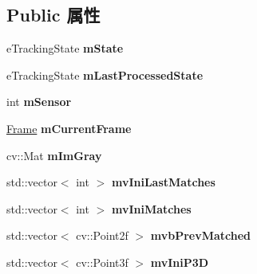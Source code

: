 \subsection*{Public 属性}
\begin{DoxyCompactItemize}
\item 
\hypertarget{classORB__SLAM2_1_1Tracking_a37cadc53a335fd802fed2fd9b24e93e1}{e\-Tracking\-State {\bfseries m\-State}}\label{classORB__SLAM2_1_1Tracking_a37cadc53a335fd802fed2fd9b24e93e1}

\item 
\hypertarget{classORB__SLAM2_1_1Tracking_a98be1e579a7e9271449d079c4f3c8769}{e\-Tracking\-State {\bfseries m\-Last\-Processed\-State}}\label{classORB__SLAM2_1_1Tracking_a98be1e579a7e9271449d079c4f3c8769}

\item 
\hypertarget{classORB__SLAM2_1_1Tracking_a18bffeb950dd18e5d74807cd9741c013}{int {\bfseries m\-Sensor}}\label{classORB__SLAM2_1_1Tracking_a18bffeb950dd18e5d74807cd9741c013}

\item 
\hypertarget{classORB__SLAM2_1_1Tracking_ad21299ab1995c8fb7115bda57773d307}{\hyperlink{classORB__SLAM2_1_1Frame}{Frame} {\bfseries m\-Current\-Frame}}\label{classORB__SLAM2_1_1Tracking_ad21299ab1995c8fb7115bda57773d307}

\item 
\hypertarget{classORB__SLAM2_1_1Tracking_af7ef78c9eed81f0701a1d12b3f377875}{cv\-::\-Mat {\bfseries m\-Im\-Gray}}\label{classORB__SLAM2_1_1Tracking_af7ef78c9eed81f0701a1d12b3f377875}

\item 
\hypertarget{classORB__SLAM2_1_1Tracking_ace08a986d9cbe3fe578c189242b94489}{std\-::vector$<$ int $>$ {\bfseries mv\-Ini\-Last\-Matches}}\label{classORB__SLAM2_1_1Tracking_ace08a986d9cbe3fe578c189242b94489}

\item 
\hypertarget{classORB__SLAM2_1_1Tracking_a1c89fa1b3512238f15283857ed94c79a}{std\-::vector$<$ int $>$ {\bfseries mv\-Ini\-Matches}}\label{classORB__SLAM2_1_1Tracking_a1c89fa1b3512238f15283857ed94c79a}

\item 
\hypertarget{classORB__SLAM2_1_1Tracking_a9ee7c26c1db845fef73c55ee0bb5c9f2}{std\-::vector$<$ cv\-::\-Point2f $>$ {\bfseries mvb\-Prev\-Matched}}\label{classORB__SLAM2_1_1Tracking_a9ee7c26c1db845fef73c55ee0bb5c9f2}

\item 
\hypertarget{classORB__SLAM2_1_1Tracking_adced44c2c047c18f3db6c7bfd7b289f0}{std\-::vector$<$ cv\-::\-Point3f $>$ {\bfseries mv\-Ini\-P3\-D}}\label{classORB__SLAM2_1_1Tracking_adced44c2c047c18f3db6c7bfd7b289f0}


\end{DoxyCompactItemize}
